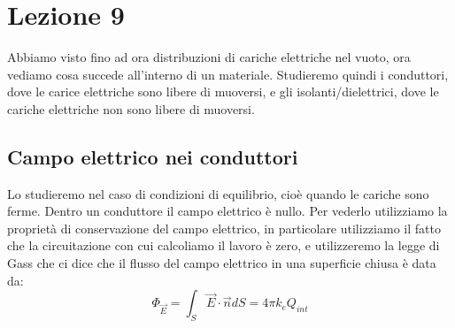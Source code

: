 \chapter{Lezione 9}
Abbiamo visto fino ad ora distribuzioni di cariche elettriche nel vuoto, ora vediamo cosa succede all'interno di un materiale. Studieremo quindi i conduttori, dove le carice elettriche sono libere di muoversi, e gli isolanti/dielettrici, dove le cariche elettriche non sono libere di muoversi.

\section{Campo elettrico nei conduttori}
Lo studieremo nel caso di condizioni di equilibrio, cioè quando le cariche sono ferme. Dentro un conduttore il campo elettrico è nullo. Per vederlo utilizziamo la proprietà di conservazione del campo elettrico, in particolare utilizziamo il fatto che la circuitazione con cui calcoliamo il lavoro è zero, e utilizzeremo la legge di Gass che ci dice che il flusso del campo elettrico in una superficie chiusa è data da:
$$ \Phi_{\vec{E}}= \int_{S}^{} \vec{E}\cdot \vec{n} dS = 4\pi k_e Q_{int}$$

